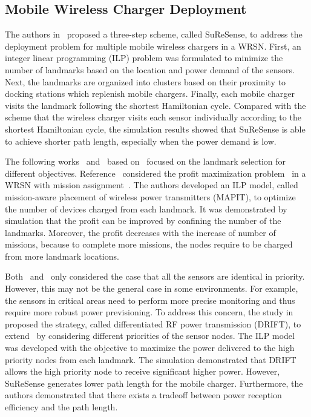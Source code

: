 \documentclass[twocolumn,10pt]{IEEEtran}
\begin{document}
\subsection{Mobile Wireless Charger Deployment}  

The authors in~\cite{Erol-Kantarci2012Suresense} proposed a three-step scheme, called SuReSense, to address the deployment problem for multiple mobile wireless chargers in a WRSN. First, an integer linear programming (ILP) problem was formulated to minimize the number of landmarks based on the location and power demand of the sensors. Next, the landmarks are organized into clusters based on their proximity to docking stations which replenish mobile chargers. Finally, each mobile charger visits the landmark following the shortest Hamiltonian cycle. Compared with the scheme that the wireless charger visits each sensor individually according to the shortest Hamiltonian cycle, the simulation results showed that SuReSense is able to achieve shorter path length, especially when the power demand is low. 

The following works~\cite{M2012Erol-Kantarci} and~\cite{Erol-Kantarci2012DRIFT} based on~\cite{Erol-Kantarci2012Suresense} focused on the landmark selection for different objectives.  Reference~\cite{M2012Erol-Kantarci} considered the profit maximization problem~\cite{T.La2011Porta} in a WRSN with mission assignment~\cite{L.2014Porta}. The authors developed an ILP model, called mission-aware placement of wireless power transmitters (MAPIT), to optimize the number of devices charged from each landmark. It was demonstrated by simulation that the profit can be improved by confining the number of the landmarks. Moreover, the profit decreases with the increase of number of missions, because to complete more missions, the nodes require to be charged from more landmark locations.  

Both~\cite{Erol-Kantarci2012Suresense} and~\cite{M2012Erol-Kantarci} only considered the case that all the sensors are identical in priority. However, this may not be the general case in some environments. For example, the sensors in critical areas need to perform more precise monitoring and thus require more robust power previsioning. To address this concern, the study in~\cite{Erol-Kantarci2012DRIFT} proposed the strategy, called differentiated RF power transmission (DRIFT), to extend~\cite{Erol-Kantarci2012Suresense} by considering different priorities of the sensor nodes. The ILP model was developed with the objective to maximize the power delivered to the high priority nodes from each landmark. The simulation demonstrated that DRIFT allows the high priority node to receive significant higher power. However, SuReSense generates lower path length for the mobile charger. Furthermore, the authors demonstrated that there exists a tradeoff between power reception efficiency and the path length.
 
\end{document}
